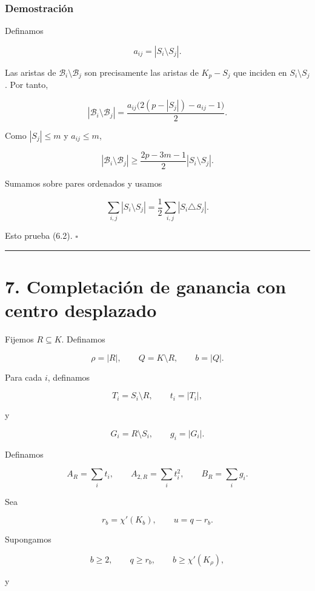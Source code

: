 \documentclass[spanish,11pt,a4paper]{article}
\begin{document}
\subsubsection{Demostración}\label{demostraciuxf3n-5}

Definamos

\[
a_{ij}=|S_i\setminus S_j|.
\]

Las aristas de \(\mathcal B_i\setminus\mathcal B_j\) son precisamente
las aristas de \(K_p-S_j\) que inciden en \(S_i\setminus S_j\). Por
tanto,

\[
|\mathcal B_i\setminus\mathcal B_j|
=
\frac{a_{ij}\bigl(2(p-|S_j|)-a_{ij}-1\bigr)}2.
\]

Como \(|S_j|\le m\) y \(a_{ij}\le m\),

\[
|\mathcal B_i\setminus\mathcal B_j|
\ge
\frac{2p-3m-1}{2}|S_i\setminus S_j|.
\]

Sumamos sobre pares ordenados y usamos

\[
\sum_{i,j}|S_i\setminus S_j|
=
\frac12\sum_{i,j}|S_i\triangle S_j|.
\]

Esto prueba (6.2). \(\square\)

\begin{center}\rule{0.5\linewidth}{0.5pt}\end{center}

\section{7. Completación de ganancia con centro
desplazado}\label{completaciuxf3n-de-ganancia-con-centro-desplazado}

Fijemos \(R\subseteq K\). Definamos

\[
\rho=|R|,
\qquad
Q=K\setminus R,
\qquad
b=|Q|.
\]

Para cada \(i\), definamos

\[
T_i=S_i\setminus R,
\qquad
t_i=|T_i|,
\]

y

\[
G_i=R\setminus S_i,
\qquad
g_i=|G_i|.
\]

Definamos

\[
A_R=\sum_i t_i,
\qquad
A_{2,R}=\sum_i t_i^2,
\qquad
B_R=\sum_i g_i.
\]

Sea

\[
r_b=\chi'(K_b),
\qquad
u=q-r_b.
\]

Supongamos

\[
b\ge2,
\qquad
q\ge r_b,
\qquad
b\ge\chi'(K_\rho),
\tag{7.1}
\]

y
\end{document}

